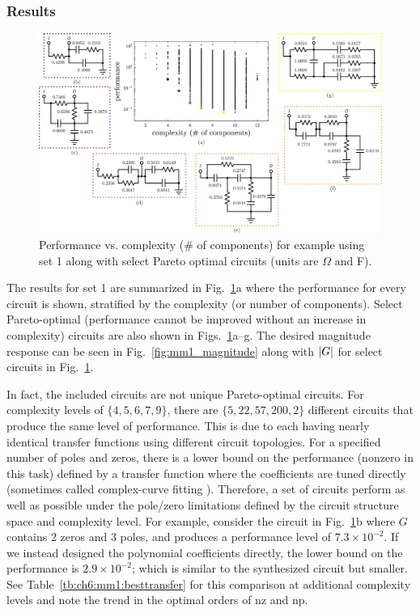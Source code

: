 \subsubsection{Results}

\begin{figure}[t]
\centering
\includegraphics[width=\textwidth]{../ch6/figures/reduced/r_ex1_set1}
\caption[Performance vs. complexity for  example using set 1 along with select Pareto optimal circuits.]{Performance vs. complexity (\# of components) for  example using set 1 along with select Pareto optimal circuits (units are $\Omega$ and F).\label{fig:ch6:ex1:set1}}
\end{figure}

The results for set 1 are summarized in Fig.~\ref{fig:ch6:ex1:set1}a where the performance for every circuit is shown, stratified by the complexity (or number of components).   
Select Pareto-optimal (performance cannot be improved without an increase in complexity) circuits are also shown in Figs.~\ref{fig:ch6:ex1:set1}a--g.
The desired magnitude response can be seen in Fig.~\ref{fig:mm1_magnitude} along with $\lvert G\rvert$ for select circuits in Fig.~\ref{fig:ch6:ex1:set1}.



In fact, the included circuits are not unique Pareto-optimal circuits. 
For complexity levels of $\{4,5,6,7,9\}$, there are $\{5,22,57,200,2\}$ different circuits that produce the same level of performance.
This is due to each having nearly identical transfer functions using different circuit topologies.
For a specified number of poles and zeros, there is a lower bound on the performance (nonzero in this task) defined by a transfer function where the coefficients are tuned directly (sometimes called complex-curve fitting \cite{Levy1959a}).
Therefore, a set of circuits perform as well as possible under the pole/zero limitations defined by the circuit structure space and complexity level.
For example, consider the circuit in Fig.~\ref{fig:ch6:ex1:set1}b where $G$ contains 2 zeros and 3 poles, and produces a performance level of $7.3 \times 10^{-2}$. If we instead designed the polynomial coefficients directly, the lower bound on the performance is $2.9 \times 10^{-2}$; which is similar to the synthesized circuit but smaller.
See Table~\ref{tb:ch6:mm1:besttransfer} for this comparison at additional complexity levels and note the trend in the optimal orders of \gls{nz} and \gls{np}.

